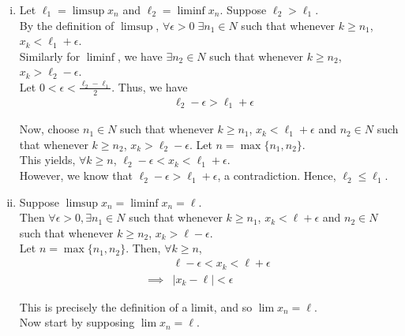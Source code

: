 \documentclass[12pt]{article}
\begin{document}
\begin{enumerate}[i)]
	\item Let $\ell_1 = \limsup{x_n}$ and $\ell_2 = \liminf{x_n}$. Suppose $\ell_2 > \ell_1$.\\
	
	By the definition of $\limsup$, $\forall \epsilon > 0 \; \exists n_1 \in N$ such that whenever $k \geq n_1$, $x_k < \ell_1 + \epsilon$.\\
	
	Similarly for $\liminf$, we have $\exists n_2 \in N$ such that whenever $k \geq n_2$, $x_k > \ell_2 - \epsilon$.\\
	
	Let $0 < \epsilon < \frac{\ell_2 - \ell_1}{2}$. Thus, we have
	\begin{align*}
		&\ell_2 - \epsilon > \ell_1 + \epsilon
	\end{align*}
	
	Now, choose $n_1 \in N$ such that whenever $k \geq n_1$, $x_k < \ell_1 + \epsilon$ and $n_2 \in N$ such that whenever $k \geq n_2$, $x_k > \ell_2 - \epsilon$. Let $n = \max{\{n_1, n_2\}}$.\\
	
	This yields, $\forall k \geq n$, $\ell_2 - \epsilon < x_k < \ell_1 + \epsilon$.\\
	
	However, we know that $\ell_2 - \epsilon > \ell_1 + \epsilon$, a contradiction. Hence, $\ell_2 \leq \ell_1$.
	
	\item Suppose $\limsup{x_n} = \liminf{x_n} = \ell$.\\
	
	Then $\forall \epsilon > 0, \exists n_1 \in N$ such that whenever $k \geq n_1$, $x_k < \ell + \epsilon$ and $n_2 \in N$ such that whenever $k \geq n_2$, $x_k > \ell - \epsilon$.\\
	
	Let $n = \max{\{n_1, n_2\}}$. Then, $\forall k \geq n$, 
	\begin{align*}
		&\ell - \epsilon < x_k < \ell + \epsilon\\
		\implies &| x_k - \ell | < \epsilon
	\end{align*}
	
	This is precisely the definition of a limit, and so $\lim{x_n} = \ell$.\\
	
	Now start by supposing $\lim{x_n} = \ell$.\\
	

\end{enumerate}
\end{document}
